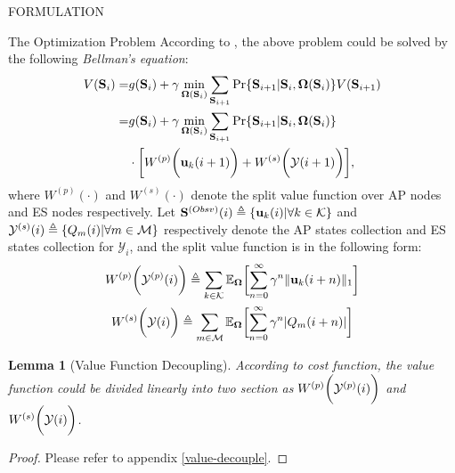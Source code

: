 \documentclass[10pt, conference, letterpaper]{IEEEtran}
\newtheorem{lemma}{Lemma}
\newcommand{\define}{\triangleq}
\renewcommand{\vec}{\mathbf}
\DeclarePairedDelimiter{\set}{\{}{\}}
\DeclarePairedDelimiter{\Inorm}{\|}{\|_1}
\DeclarePairedDelimiter{\Paren}{\bigg(}{\bigg)}
\DeclarePairedDelimiter{\Bracket}{\bigg[}{\bigg]}
\newcommand{\apSet}{\mathcal{K}}
\newcommand{\esSet}{\mathcal{M}}
\newcommand{\Stat}{\mathbf{S}}
\newcommand{\Obsv}{\mathcal{Y}}
\newcommand{\Policy}{\mathbf{\Omega}}
\begin{document}
\begin{section}{FORMULATION}
\begin{subsection}{The Optimization Problem}
            According to \cite{sutton1998introduction}, the above problem could be solved by the following \emph{Bellman's equation}:
            \begin{align}
                V(\Stat_{i}) =& g(\Stat_i) + \gamma \min_{\Policy(\Stat_{i})} \sum_{\Stat_{i+1}} \Pr\{ \Stat_{i+1}|\Stat_{i}, \Policy(\Stat_{i}) \} V(\Stat_{i+1})
                \nonumber\\
                =& g(\Stat_{i}) + \gamma \min_{\Policy(\Stat_{i})} \sum_{\Stat_{i+1}} \Pr\{ \Stat_{i+1}|\Stat_{i}, \Policy(\Stat_{i}) \}
                    \nonumber\\
                    & \cdot \Bracket{ W^{(p)}\Paren{\vec{u}_k(i+1)} + W^{(s)}\Paren{\Obsv(i+1)} },
            \end{align}
            where $W^{(p)}(\cdot)$ and $W^{(s)}(\cdot)$ denote the split value function over AP nodes and ES nodes respectively.
            Let $\Stat^{(Obsv)}(i) \define \set{\vec{u}_k(i)|\forall k\in\apSet}$ and $\Obsv^{(s)}(i) \define \set{Q_m(i)|\forall m\in\esSet}$ respectively denote the AP states collection and ES states collection for $\Obsv_i$, and the split value function is in the following form:
            \begin{gather}
                W^{(p)}\Paren{\Obsv^{(p)}(i)} \define \sum_{k\in\apSet}
                    \mathbb{E}_{\Policy}\Bracket{\sum_{n=0}^{\infty} \gamma^{n} \Inorm{\vec{u}_k(i+n)}}
                \\
                W^{(s)}\Paren{\Obsv(i)} \define \sum_{m\in\esSet}
                    \mathbb{E}_{\Policy}\Bracket{\sum_{n=0}^{\infty} \gamma^{n} |Q_m(i+n)|}
            \end{gather}

            \begin{lemma}[Value Function Decoupling]
                According to cost function, the value function could be divided linearly into two section as $ W^{(p)}\Paren{\Obsv^{(p)}(i)}$ and $W^{(s)}\Paren{\Obsv(i)}$.
            \end{lemma}
            \begin{proof}
                Please refer to appendix \ref{value-decouple}.
            \end{proof}


\end{subsection}
\end{section}
\end{document}
